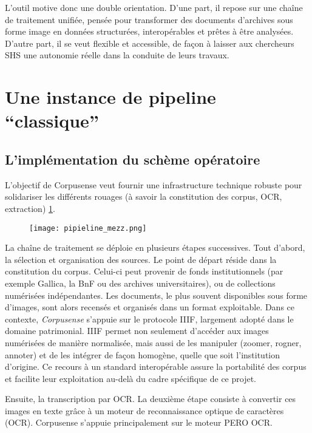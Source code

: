 L'outil motive donc une double orientation. D’une part, il repose sur une chaîne de traitement unifiée, pensée pour transformer des documents d’archives sous forme image en données structurées, interopérables et prêtes à être analysées. D’autre part, il se veut flexible et accessible, de façon à laisser aux chercheurs SHS une autonomie réelle dans la conduite de leurs travaux.

\section{Une instance de pipeline \enquote{classique}}

\subsection{L'implémentation du schème opératoire}

L’objectif de Corpusense veut fournir une infrastructure technique robuste pour solidariser les différents rouages (à savoir la constitution des corpus, OCR, extraction) \ref{fig:pipieline_mezz}.

\begin{figure}[htbp]
\centering
\texttt{[image: pipieline\_mezz.png]}
\caption{}
\label{fig:pipieline_mezz}
\end{figure}

La chaîne de traitement se déploie en plusieurs étapes successives. Tout d'abord, la sélection et organisation des sources. Le point de départ réside dans la constitution du corpus. Celui-ci peut provenir de fonds institutionnels (par exemple Gallica, la BnF ou des archives universitaires), ou de collections numérisées indépendantes. Les documents, le plus souvent disponibles sous forme d’images, sont alors recensés et organisés dans un format exploitable. Dans ce contexte, \emph{Corpusense} s’appuie sur le protocole IIIF, largement adopté dans le domaine patrimonial. IIIF permet non seulement d’accéder aux images numérisées de manière normalisée, mais aussi de les manipuler (zoomer, rogner, annoter) et de les intégrer de façon homogène, quelle que soit l’institution d’origine. Ce recours à un standard interopérable assure la portabilité des corpus et facilite leur exploitation au-delà du cadre spécifique de ce projet. 

Ensuite, la transcription par OCR. La deuxième étape consiste à convertir ces images en texte grâce à un moteur de reconnaissance optique de caractères (OCR). Corpusense s’appuie principalement sur le moteur PERO OCR. 

